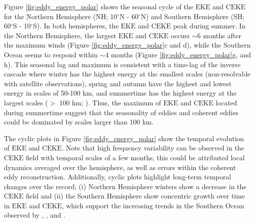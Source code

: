 \documentclass[draft,linenumbers]{agujournal2019}
\newcommand{\EKE}{\textrm{EKE}}
\newcommand{\CEKE}{\textrm{CEKE}}
\begin{document}
	Figure \ref{fig:eddy_energy_polar} shows the seasonal cycle of the $\EKE$ and $\CEKE$ for the Northern Hemisphere (NH; 10$^\circ$N - 60$^\circ$N) and Southern Hemisphere (SH; 60$^\circ$S - 10$^\circ$S). 
	In both hemispheres, the $\EKE$ and $\CEKE$ peak during summer. In the Northern Hemisphere, the largest $\EKE$ and $\CEKE$ occurs $\sim$6 months after the maximum winds (Figure \ref{fig:eddy_energy_polar}c and d), while the Southern Ocean seems to respond within $\sim$4 months (Figure \ref{fig:eddy_energy_polar}g, and h). This seasonal lag and maximum is consistent with a time-lag of the inverse cascade \citep{Sasaki_seasonal_2014, Qiu_seasonal_2014} where winter has the highest energy at the smallest scales (non-resolvable with satellite observations), spring and autumn have the highest and lowest energy in scales of 50-100 km, and summertime has the highest energy at the largest scales ($>$ 100 km; \citealt{Uchida_Seasonality_2017}). 
	Thus, the maximum of $\EKE$ and $\CEKE$ located during summertime suggest that the seasonality of eddies and coherent eddies could be dominated by scales larger than 100 km.

	The cyclic plots in Figure \ref{fig:eddy_energy_polar} show the temporal evolution of $\EKE$ and $\CEKE$. 
	Note that high frequency variability can be observed in the $\CEKE$ field with temporal scales of a few months, this could be attributed local dynamics averaged over the hemisphere, as well as errors within the coherent eddy reconstruction. 
	Additionally, cyclic plots highlight long-term temporal changes over the record; (i) Northern Hemisphere winters show a decrease in the $\CEKE$ field and (ii) the Southern Hemisphere show concentric growth over time in $\EKE$ and $\CEKE$, which support the increasing trends in the Southern Ocean observed by \citet{Hogg_Recent_2015}, \citet{Martinez_TKE_2019}, and \citet{Martinez_Kinetic_2021}. 
\end{document}
